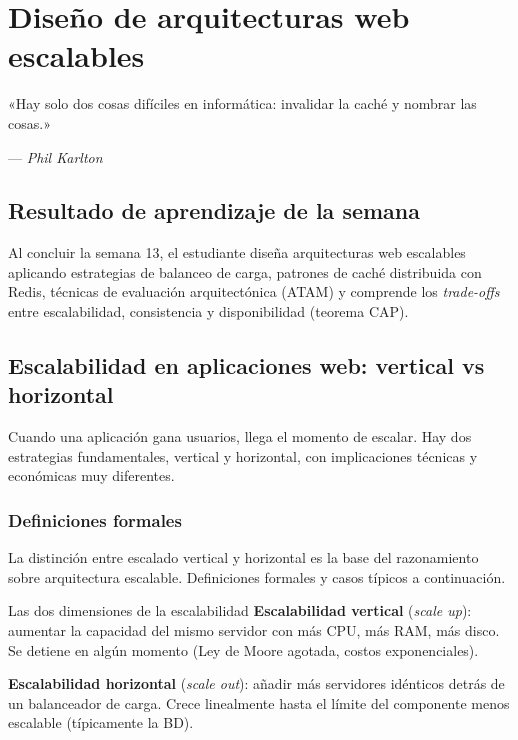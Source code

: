 \chapter{Diseño de arquitecturas web escalables}
\label{cap:semana13}

\epigraph{«Hay solo dos cosas difíciles en informática: invalidar la
caché y nombrar las cosas.»}{--- \textit{Phil Karlton}}

\section*{Resultado de aprendizaje de la semana}
Al concluir la semana 13, el estudiante diseña arquitecturas web
escalables aplicando estrategias de balanceo de carga, patrones de
caché distribuida con Redis, técnicas de evaluación arquitectónica
(ATAM) y comprende los \emph{trade-offs} entre escalabilidad,
consistencia y disponibilidad (teorema CAP).

\section{Escalabilidad en aplicaciones web: vertical vs horizontal}

Cuando una aplicación gana usuarios, llega el momento de
escalar. Hay dos estrategias fundamentales, vertical y horizontal,
con implicaciones técnicas y económicas muy diferentes.


\subsection{Definiciones formales}

La distinción entre escalado vertical y horizontal es la
base del razonamiento sobre arquitectura escalable. Definiciones
formales y casos típicos a continuación.


\begin{cajadefinicion}{Las dos dimensiones de la escalabilidad}
\textbf{Escalabilidad vertical} (\emph{scale up}): aumentar la
capacidad del mismo servidor con más CPU, más RAM, más disco. Se
detiene en algún momento (Ley de Moore agotada, costos exponenciales).

\textbf{Escalabilidad horizontal} (\emph{scale out}): añadir más
servidores idénticos detrás de un balanceador de carga. Crece
linealmente hasta el límite del componente menos escalable
(típicamente la BD).
\end{cajadefinicion}

